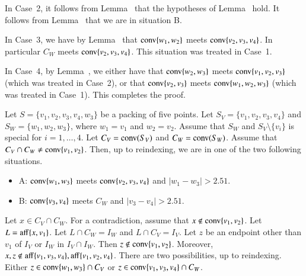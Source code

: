 \begin{tarskidata}
\begin{tarski}
\begin{proved}
In Case~2, it follows from Lemma~ that
the hypotheses of Lemma~ hold.  It follows
from Lemma~ that we are in situation B.

In Case~3, we have by Lemma~ that ${\operatorname{conv}}\{w_1,w_2\}$
meets ${\operatorname{conv}}\{v_2,v_3,v_4\}$. In particular $C_W$ meets
${\operatorname{conv}}\{v_2,v_3,v_4\}$.  This situation was treated in Case~1.

In Case~4, by Lemma~, we either have that ${\operatorname{conv}}\{w_2,w_3\}$
meets ${\operatorname{conv}}\{v_1,v_2,v_3\}$ (which was treated in Case~2),
or that ${\operatorname{conv}}\{v_2,v_3\}$ meets ${\operatorname{conv}}\{w_1,w_2,w_3\}$
(which was treated in Case~1).  This completes the proof.
\swallowed\end{proved}
\end{tarski}





\begin{tarski}

\begin{lemma}
Let $S=\{v_1,v_2,v_3,v_4,w_3\}$ be a packing of five points.
Let $S_V =\{v_1,v_2,v_3,v_4\}$ and $S_W=\{w_1,w_2,w_3\}$, where
$w_1=v_1$ and $w_2=v_2$.  
Assume that $S_W$ and $S_V\setminus\{v_i\}$ is special for $i=1,\ldots,4$.
Let $C_V={\operatorname{conv}}(S_V)$ and $C_W={\operatorname{conv}}(S_W)$.
Assume that $C_V\cap C_W\ne {\operatorname{conv}}\{v_1,v_2\}$.
Then, up to reindexing, we are in one of the two following situations.
\begin{itemize}
\item A: ${\operatorname{conv}}\{w_1,w_3\}$ meets ${\operatorname{conv}}\{v_2,v_3,v_4\}$
and $|w_1-w_3|>2.51$.
\item B:  ${\operatorname{conv}}\{v_3,v_4\}$ meets $C_W$ and $|v_3-v_4|>2.51$.
\end{itemize}
\end{lemma}

\begin{proved}
Let $x\in C_V\cap C_W$.  For a contradiction, assume that
$x\not\in{\operatorname{conv}}\{v_1,v_2\}$.  Let $L={\operatorname{aff}}\{x,v_1\}$.
Let $L\cap C_W = I_W$ and $L\cap C_V = I_V$.  Let $z$ be an endpoint
other than $v_1$
of $I_V$ or $I_W$ in $I_V\cap I_W$.  Then $z\not\in{\operatorname{conv}}\{v_1,v_2\}$. 
Moreover, $x,z\not\in{\operatorname{aff}}\{v_1,v_3,v_4\},{\operatorname{aff}}\{v_1,v_2,v_4\}$. 
There are two possibilities, up to reindexing.
Either $z\in {\operatorname{conv}}\{w_1,w_3\}\cap C_V$ or 
$z\in{\operatorname{conv}}\{v_1,v_3,v_4\}\cap C_W$.


\end{proved}
\end{tarski}
\end{tarskidata}
